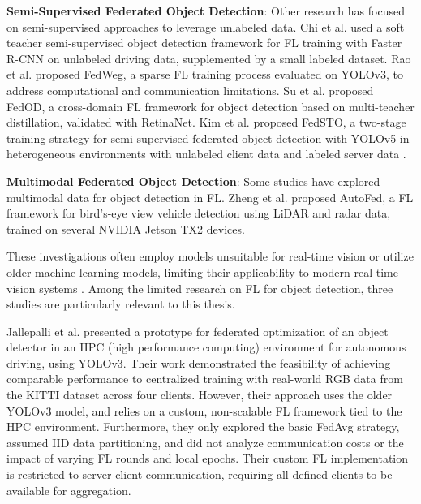 \documentclass[thesis]{mas_proposal}
\begin{document}
\textbf{Semi-Supervised Federated Object Detection}: Other research has focused on semi-supervised approaches to leverage unlabeled data. Chi et al. \cite{chi2021federated} used a soft teacher semi-supervised object detection framework for FL training with Faster R-CNN on unlabeled driving data, supplemented by a small labeled dataset. Rao et al. \cite{rao2021fedweg} proposed FedWeg, a sparse FL training process evaluated on YOLOv3, to address computational and communication limitations. Su et al. \cite{su2021fedod} proposed FedOD, a cross-domain FL framework for object detection based on multi-teacher distillation, validated with RetinaNet. Kim et al. \cite{kim2022fedsto} proposed FedSTO, a two-stage training strategy for semi-supervised federated object detection with YOLOv5 in heterogeneous environments with unlabeled client data and labeled server data \cite{quemeneur2024fedpylot}.


\textbf{Multimodal Federated Object Detection}: Some studies have explored multimodal data for object detection in FL. Zheng et al. \cite{zheng2021autofed} proposed AutoFed, a FL framework for bird's-eye view vehicle detection using LiDAR and radar data, trained on several NVIDIA Jetson TX2 devices.

These investigations often employ models unsuitable for real-time vision or utilize older machine learning models, limiting their applicability to modern real-time vision systems \cite{quemeneur2024fedpylot}. Among the limited research on FL for object detection, three studies are particularly relevant to this thesis.

Jallepalli et al. \cite{jallepalli2021federated} presented a prototype for federated optimization of an object detector in an HPC (high performance computing) environment for autonomous driving, using YOLOv3. Their work demonstrated the feasibility of achieving comparable performance to centralized training with real-world RGB data from the KITTI dataset across four clients.  However, their approach uses the older YOLOv3 model, and relies on a custom, non-scalable FL framework tied to the HPC environment. Furthermore, they only explored the basic FedAvg strategy, assumed IID data partitioning, and did not analyze communication costs or the impact of varying FL rounds and local epochs. Their custom FL implementation is restricted to server-client communication, requiring all defined clients to be available for aggregation.
\end{document}
